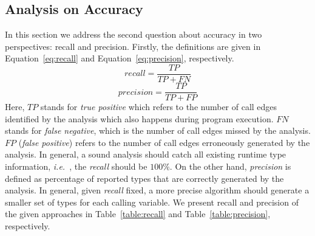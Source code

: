 \documentclass{fac}
\newcommand\ie{\textit{i.e.\ }}
\begin{document}
\subsection{Analysis on Accuracy}\label{subsec:accuracy}

In this section we address the second question about accuracy in two perspectives: recall and precision. Firstly, the definitions are given in Equation~\ref{eq:recall} and Equation~\ref{eq:precision}, respectively.
\begin{equation}\label{eq:recall}
recall = \dfrac{TP}{TP+FN}
\end{equation}
\begin{equation}\label{eq:precision}
precision =  \dfrac{TP}{TP+FP}
\end{equation}
Here, $TP$ stands for \emph{true positive} which refers to the number of call edges identified by the analysis which also happens during program execution. $FN$ stands for \emph{false negative}, which is the number of call edges missed by the analysis. $FP$ (\emph{false positive}) refers to the number of call edges erroneously generated by the analysis. In general, a sound analysis should catch all existing runtime type information, \ie, the \emph{recall} should be $100\%$. On the other hand, \emph{precision} is defined as percentage of reported types that are correctly generated by the analysis. In general, given \emph{recall} fixed, a more precise algorithm should generate a smaller set of types for each calling variable. %
We present recall and precision of the given approaches in Table~\ref{table:recall} and Table~\ref{table:precision}, respectively.


\end{document}
